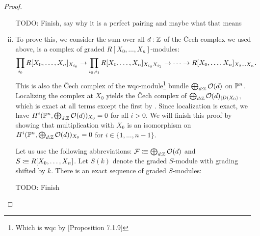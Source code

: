 \begin{proof}
\begin{enumerate}[(i)]
    TODO: Finish, say why it is a perfect pairing and maybe what that means
  \item To prove this, we consider the sum over all $d:\mathbb{Z}$ of the \v{C}ech complex we used above, is a complex of graded $R[X_0,\dots,X_n]$-modules:
  \[
    \prod_{i_0}R[X_0,\dots,X_n]_{X_{i_0}} \to \prod_{i_0,i_1} R[X_0,\dots,X_n]_{X_{i_0} X_{i_1}} \to \dots \to R[X_0,\dots,X_n]_{X_0\dots X_n}
    \rlap{.}
  \]
  This is also the \v{C}ech complex of the wqc-module\footnote{Which is wqc by \cite{draft}[Proposition 7.1.9]} bundle $\bigoplus_{d:\mathbb{Z}}\mathcal O(d)$ on $\mathbb{P}^n$.
  Localizing the complex at $X_0$ yields the \v{C}ech complex of $\bigoplus_{d:\mathbb{Z}}\mathcal O(d)_{\vert D(X_0)}$, which is exact at all terms except the first by .
  Since localization is exact, we have $H^i(\mathbb{P}^n,\bigoplus_{d:\mathbb{Z}}\mathcal O(d))_{X_0}=0$ for all $i>0$.
  We will finish this proof by showing that multiplication with $X_0$ is an isomorphism on $H^i(\mathbb{P}^n,\bigoplus_{d:\mathbb{Z}}\mathcal O(d))_{X_0}=0$ for $i\in \{1,\dots,n-1\}$.

  Let us use the following abbreviations: $\mathcal F\vcentcolon\mspace{-1.2mu}\equiv \bigoplus_{d:\mathbb{Z}}\mathcal O(d)$ and $S\vcentcolon\mspace{-1.2mu}\equiv R[X_0,\dots,X_n]$.
  Let $S(k)$ denote the graded $S$-module with grading shifted by $k$.
  There is an exact sequence of graded $S$-modules:
  \begin{center}
  \end{center}
  TODO: Finish
  
  \end{enumerate}
\end{proof}
